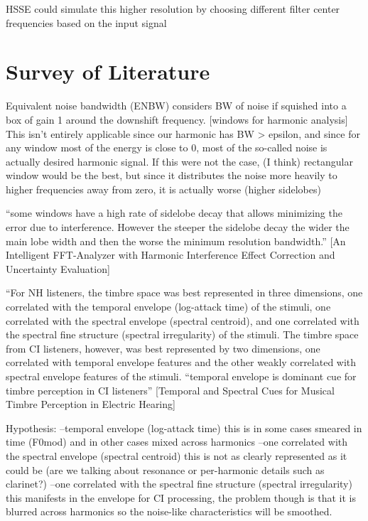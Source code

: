 \documentclass [11pt, proquest,oneside] {uwthesis}[2015/03/03]
\begin{document}
HSSE could simulate this higher resolution by choosing different filter center frequencies based on the input signal

\section{Survey of Literature}

Equivalent noise bandwidth (ENBW) considers BW of noise if squished into a box of gain 1 around the downshift frequency.  [windows for harmonic analysis] This isn't entirely applicable since our harmonic has BW > epsilon, and since for any window most of the energy is close to 0, most of the so-called noise is actually desired harmonic signal.  If this were not the case, (I think) rectangular window would be the best, but since it distributes the noise more heavily to higher frequencies away from zero, it is actually worse (higher sidelobes)

``some windows have a high rate of sidelobe decay that allows minimizing the error due to interference. However the steeper the sidelobe decay
the wider the main lobe width and then the worse the minimum resolution bandwidth.'' [An Intelligent FFT-Analyzer with Harmonic Interference Effect Correction and Uncertainty Evaluation]

``For NH listeners, the timbre space was best represented in three dimensions, one correlated with the temporal envelope (log-attack time) of the stimuli, one correlated with the spectral envelope (spectral centroid), and one correlated with the spectral fine structure (spectral irregularity) of the stimuli. The timbre space from CI listeners, however, was best represented by two dimensions, one correlated with temporal envelope features and the other weakly correlated with spectral envelope features of the stimuli. 
``temporal envelope is dominant cue for timbre perception in CI listeners''
[Temporal and Spectral Cues for Musical Timbre
Perception in Electric Hearing]

Hypothesis:
--temporal envelope (log-attack time)
this is in some cases smeared in time (F0mod) and in other cases mixed across harmonics
--one correlated with the spectral envelope (spectral centroid)
this is not as clearly represented as it could be (are we talking about resonance or per-harmonic details such as clarinet?)
--one correlated with the spectral fine structure (spectral irregularity)
this manifests in the envelope for CI processing, the problem though is that it is blurred across harmonics so the noise-like characteristics will be smoothed.
\end{document}
